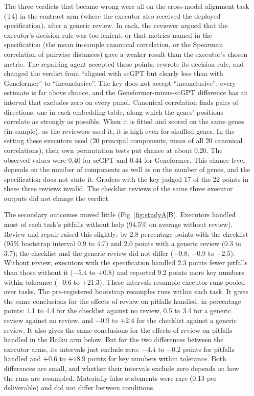 The three verdicts that became wrong were all on the cross-model
alignment task (T4) in the contract arm (where the executor also received
the deployed specification), after a generic review. In each,
the reviewer argued that the executor's decision rule was too lenient, or
that metrics named in the specification (the mean in-sample canonical
correlation, or the Spearman correlation of pairwise distances) gave a
weaker result than the executor's chosen metric. The repairing agent
accepted these points, rewrote its decision rule, and changed the verdict
from ``aligned with scGPT but clearly less than with Geneformer'' to
``inconclusive''. The key does not accept ``inconclusive'': every estimate
is far above chance, and the Geneformer-minus-scGPT difference has an
interval that excludes zero on every panel. Canonical correlation finds
pairs of directions, one in each embedding table, along which the genes'
positions correlate as strongly as possible. When it is fitted and scored
on the same genes (in-sample), as the reviewers used it, it is high even
for shuffled genes.
In the setting these executors used (20 principal components, mean of all
20 canonical correlations), their own permutation tests put chance at
about 0.20. The observed values were 0.40 for scGPT and 0.44 for
Geneformer. This chance level depends on the number of components as well
as on the number of genes, and the specification does not state it.
Graders with the key judged 17 of the 22 points in these three reviews
invalid. The checklist reviews of the same three executor outputs
did not change the verdict.

The secondary outcomes moved little (Fig~\ref{fig:studyA}B). Executors
handled most of each task's pitfalls without help (94.5\% on average
without review). Review and repair raised this slightly: by 2.8
percentage points with the checklist (95\% bootstrap interval 0.9 to 4.7)
and 2.0 points with a generic review (0.3 to 3.7); the checklist and the
generic review did not differ ($+0.8$; $-0.9$ to $+2.5$). Without review,
executors with the specification handled 2.3 points fewer pitfalls than
those without it ($-5.4$ to $+0.8$) and reported 9.2 points more key
numbers within tolerance ($-0.6$ to $+21.3$). These intervals resample
executor runs pooled over tasks. The pre-registered bootstrap resamples
runs within each task. It gives the same conclusions for the effects of
review on pitfalls handled, in percentage points: 1.1 to 4.4 for the
checklist against no review, 0.5 to 3.4 for a generic review against no
review, and $-0.9$ to $+2.4$ for the checklist against a generic review.
It also gives the same conclusions for the effects of review on pitfalls
handled in the Haiku arm below. But for the two differences between the
executor arms, its intervals just exclude zero: $-4.4$ to $-0.2$ points
for pitfalls handled and $+0.6$ to $+18.9$ points for key numbers within
tolerance. Both
differences are small, and whether their intervals exclude zero depends on
how the runs are resampled. Materially false statements were rare (0.13
per deliverable) and did not differ between conditions.

